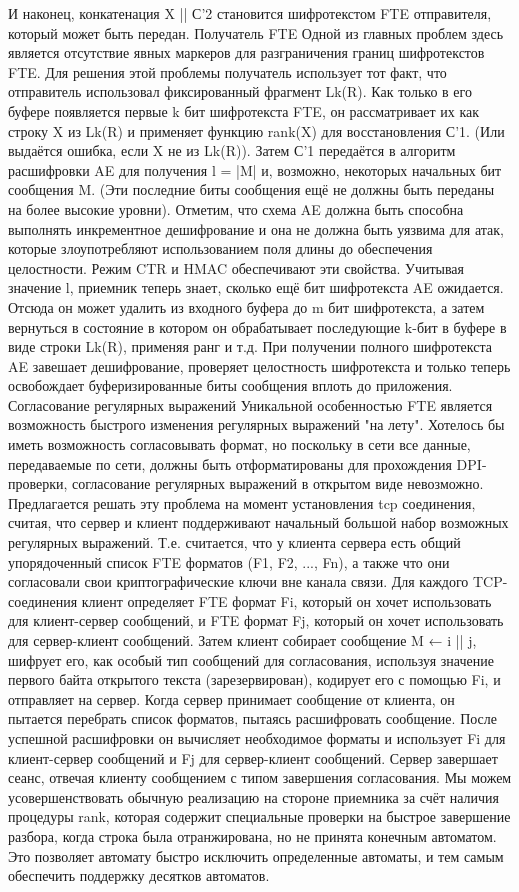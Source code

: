 И наконец, конкатенация X || С'2 становится шифротекстом FTE отправителя, который может быть передан.
Получатель FTE
Одной из главных проблем здесь является отсутствие явных маркеров для разграничения границ шифротекстов FTE.
Для решения этой проблемы получатель использует тот факт, что отправитель использовал фиксированный фрагмент Lk(R).
Как только в его буфере появляется первые k бит шифротекста FTE, он рассматривает их как строку X из Lk(R) и применяет функцию rank(X) для восстановления С'1. (Или выдаётся ошибка, если X не из Lk(R)).
Затем С'1 передаётся в алгоритм расшифровки AE для получения l = |M| и, возможно, некоторых начальных бит сообщения M. (Эти последние биты сообщения ещё не должны быть переданы на более высокие уровни).
Отметим, что схема AE должна быть способна выполнять инкрементное дешифрование и она не должна быть уязвима для атак, которые злоупотребляют использованием поля длины до обеспечения целостности. Режим CTR и HMAC обеспечивают эти свойства.
Учитывая значение l, приемник теперь знает, сколько ещё бит шифротекста AE ожидается. Отсюда он может удалить из входного буфера до m бит шифротекста, а затем вернуться в состояние в котором он обрабатывает последующие k-бит в буфере в виде строки Lk(R), применяя ранг и т.д.
При получении полного шифротекста AE завешает дешифрование, проверяет целостность шифротекста и только теперь освобождает буферизированные биты сообщения вплоть до приложения.
Согласование регулярных выражений
Уникальной особенностью FTE является возможность быстрого изменения регулярных выражений "на лету".
Хотелось бы иметь возможность согласовывать формат, но поскольку в сети все данные, передаваемые по сети, должны быть отформатированы для прохождения DPI-проверки, согласование регулярных выражений в открытом виде невозможно.
Предлагается решать эту проблема на момент установления tcp соединения, считая, что сервер и клиент поддерживают начальный большой набор возможных регулярных выражений.
Т.е. считается, что у клиента сервера есть общий упорядоченный список FTE форматов (F1, F2, ..., Fn), а также что они согласовали свои криптографические ключи вне канала связи.
Для каждого TCP-соединения клиент определяет FTE формат Fi, который он хочет использовать для клиент-сервер сообщений, и FTE формат Fj, который он хочет использовать для сервер-клиент сообщений. Затем клиент собирает сообщение M ← i || j, шифрует его, как особый тип сообщений для согласования, используя значение первого байта открытого текста (зарезервирован), кодирует его с помощью Fi, и отправляет на сервер.
Когда сервер принимает сообщение от клиента, он пытается перебрать список форматов, пытаясь расшифровать сообщение. После успешной расшифровки он вычисляет необходимое форматы и использует Fi для клиент-сервер сообщений и Fj для сервер-клиент сообщений. Сервер завершает сеанс, отвечая клиенту сообщением с типом завершения согласования.
Мы можем усовершенствовать обычную реализацию на стороне приемника за счёт наличия процедуры rank, которая содержит специальные проверки на быстрое завершение разбора, когда строка была отранжирована, но не принята конечным автоматом. Это позволяет автомату быстро исключить определенные автоматы, и тем самым обеспечить поддержку десятков автоматов.

